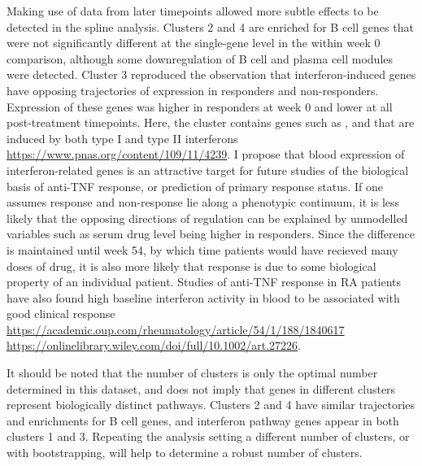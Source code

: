 \begin{outline}
Making use of data from later timepoints allowed more subtle effects to be detected in the spline analysis.
Clusters 2 and 4 are enriched for B cell genes that were not significantly different at the single-gene level in the within week 0 comparison,
although some downregulation of B cell and plasma cell modules were detected.
Cluster 3 reproduced the observation that interferon-induced genes have opposing trajectories of expression in responders and non-responders.
Expression of these genes was higher in responders at week 0 and lower at all post-treatment timepoints.
Here, the cluster contains genes such as ,  and  that are induced by both type I and type II interferons \url{https://www.pnas.org/content/109/11/4239}.
I propose that blood expression of interferon-related genes is an attractive target for future studies of the biological basis of anti-\gls{TNF} response,
or prediction of primary response status.
If one assumes response and non-response lie along a phenotypic continuum,
it is less likely that the opposing directions of regulation can be explained by unmodelled variables such as serum drug level being higher in responders.
Since the difference is maintained until week 54, by which time patients would have recieved many doses of drug,
it is also more likely that response is due to some biological property of an individual patient.
Studies of anti-\gls{TNF} response in \gls{RA} patients have also 
found high baseline interferon activity in blood to be associated with good clinical response
\url{https://academic.oup.com/rheumatology/article/54/1/188/1840617}
\url{https://onlinelibrary.wiley.com/doi/full/10.1002/art.27226}.

It should be noted that the number of clusters is only the optimal number determined in this dataset,
and does not imply that genes in different clusters represent biologically distinct pathways.
Clusters 2 and 4 have similar trajectories and enrichments for B cell genes,
and interferon pathway genes appear in both clusters 1 and 3.
Repeating the analysis setting a different number of clusters, or with bootstrapping, will help to determine a robust number of clusters.


\end{outline}
